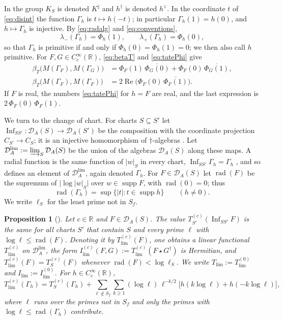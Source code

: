 \documentclass[11pt]{amsart}
\newtheorem{proposition}[theorem]{Proposition}
\theoremstyle{remark}
\numberwithin{equation}{section}
\newcommand{\R}{\mathbb R}
\newcommand{\Rel}{\operatorname{Re}}
\newcommand{\supp}{\operatorname{supp}}
\newcommand{\rd}{\operatorname{rad}}
\newcommand{\Inf}{\operatorname{Inf}}
\newcommand{\DA}{\mathcal D_A}
\newcommand{\DAl}{\mathcal D_A^{\lim}}
\newcommand{\CS}{C_S}
\newcommand{\Tl}{T_{\lim}}
\newcommand{\Il}{I_{\lim}}
\begin{document}
In \cite{P44} the group $K_S$ is denoted $K^\natural$ and $h^\dagger$ is
denoted $h^\vee$.  In the coordinate $t$ of \eqref{eq:disint} the function
$\Gamma_h$ is $t\mapsto h(-t)$; in particular $\Gamma_h(1)=h(0)$, and
$h\mapsto\Gamma_h$ is injective.  By
\eqref{eq:radalg} and \eqref{eq:conventions},
\begin{equation}
\label{eq:tatePhi}
  \lambda_-(\Gamma_h)=\Phi_h(1),\qquad\lambda_+(\Gamma_h)=\Phi_h(0),
\end{equation}
so that $\Gamma_h$ is primitive if and only if $\Phi_h(0)=\Phi_h(1)=0$; we
then also call $h$ primitive.  For $F,G\in C_c^\infty(\R)$,
\eqref{eq:betaT} and \eqref{eq:tatePhi} give
\begin{equation}
\label{eq:polarterm}
\begin{aligned}
  \beta_T\bigl(M(\Gamma_F),M(\Gamma_G)\bigr)
  &=\Phi_F(1)\,\overline{\Phi_G(0)}+\Phi_F(0)\,\overline{\Phi_G(1)},\\
  \beta_T\bigl(M(\Gamma_F),M(\Gamma_F)\bigr)
  &=2\Rel\bigl(\Phi_F(0)\,\overline{\Phi_F(1)}\bigr).
\end{aligned}
\end{equation}
If $F$ is real, the numbers \eqref{eq:tatePhi} for $h=F$ are real, and the
last expression is $2\,\Phi_F(0)\,\Phi_F(1)$.

We turn to the change of chart.  For charts $S\subseteq S'$ let
$\Inf_{SS'}\colon\DA(S)\to\DA(S')$ be the composition with the coordinate
projection $C_{S'}\to\CS$; it is an injective homomorphism of
$\dagger$-algebras \cite[Lemma~8.2]{P43}.  Let $\DAl:=\varinjlim_S\DA(S)$ be
the union of the algebras $\DA(S)$ along these maps.  A radial function is the
same function of $|w|_S$ in every chart, $\Inf_{SS'}\Gamma_h=\Gamma_h$
\cite[Lemma~3.7(v)]{P44}, and so defines an element of $\DAl$, again denoted
$\Gamma_h$.  For $F\in\DA(S)$ let $\rd(F)$ be the supremum of
$\bigl|\log|w|_S\bigr|$ over $w\in\supp F$, with $\rd(0)=0$; thus
\[
  \rd(\Gamma_h)=\sup\{|t|:t\in\supp h\}\qquad(h\ne0).
\]
We write $\ell_S$ for the least prime not in $S_f$.

\begin{proposition}[{\cite[Theorems~8.3 and~8.4]{P43}}]
\label{prop:colimit}
Let $c\in\R$ and $F\in\DA(S)$.  The value $T^{(c)}_{S'}(\Inf_{SS'}F)$ is the
same for all charts $S'$ that contain $S$ and every prime $\ell$ with
$\log\ell\le\rd(F)$.  Denoting it by $T^{(c)}_{\lim}(F)$, one obtains a
linear functional $T^{(c)}_{\lim}$ on $\DAl$, the form
$I^{(c)}_{\lim}(F,G):=T^{(c)}_{\lim}(F\star G^\dagger)$ is Hermitian, and
$T^{(c)}_{\lim}(F)=T^{(c)}_S(F)$ whenever $\rd(F)<\log\ell_S$.  We write
$\Tl:=T^{(0)}_{\lim}$ and $\Il:=I^{(0)}_{\lim}$.  For $h\in C_c^\infty(\R)$,
\begin{equation}
\label{eq:chartchange}
  T^{(c)}_{\lim}(\Gamma_h)=T^{(c)}_S(\Gamma_h)
   +\sum_{\ell\notin S_f}\sum_{k\ge1}(\log\ell)\,\ell^{-k/2}
     \bigl[h(k\log\ell)+h(-k\log\ell)\bigr],
\end{equation}
where $\ell$ runs over the primes not in $S_f$ and only the primes with
$\log\ell\le\rd(\Gamma_h)$ contribute.
\end{proposition}
\end{document}

